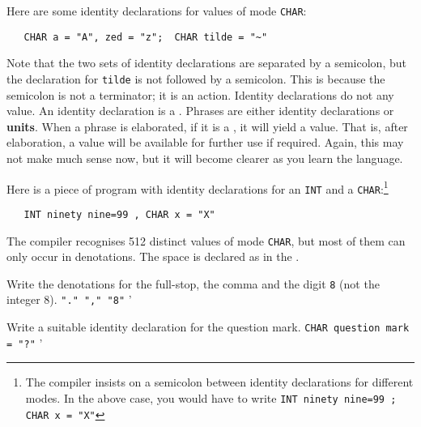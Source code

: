 Here are some identity declarations for values of mode \verb|CHAR|:
\begin{verbatim}
   CHAR a = "A", zed = "z";  CHAR tilde = "~"
\end{verbatim}
\noindent
Note that the two sets of identity declarations are separated by a
semicolon, but the declaration for \verb|tilde| is not followed by a
semicolon.  This is because the semicolon \ixtt{;} is not a
terminator; it is an action. Identity declarations do not
 any value. An identity declaration is a .
Phrases are either identity declarations or \textbf{units}.  When a
phrase is elaborated, if it is a , it will yield a value.
That is, after elaboration, a value will be available for further use
if required.  Again, this may not make much sense now, but it will
become clearer as you learn the language.

Here is a piece of program with identity declarations for an
\verb|INT| and a \verb|CHAR|:\footnote{The
\protect{}
compiler insists on a semicolon between identity declarations for
different modes. In the above case, you would have to write
\texttt{INT ninety nine=99 ; CHAR x = "X"}}
\begin{verbatim}
   INT ninety nine=99 , CHAR x = "X"
\end{verbatim}

The compiler recognises 512 distinct values of mode \verb|CHAR|, but
most of them can only occur in denotations. The space is declared as
 in the .

\begin{exercise}
\item Write the denotations for the full-stop, the comma and the
digit \verb|8| (not the integer 8).  \ans \verb|"." "," "8"|
'
\item Write a suitable identity declaration for the question mark.
\ans \verb|CHAR question mark = "?"|
'
\end{exercise}

